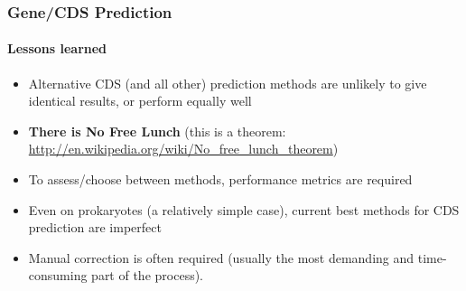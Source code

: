 \begin{frame}
   \frametitle{Gene/CDS Prediction}   
   \framesubtitle{Lessons learned}   
   \begin{itemize}
     \item Alternative CDS (and all other) prediction methods are unlikely to give identical results, or perform equally well
     \item \textbf{There is No Free Lunch} (this is a theorem: \href{http://en.wikipedia.org/wiki/No_free_lunch_theorem}{http://en.wikipedia.org/wiki/No\_free\_lunch\_theorem})
     \item To assess/choose between methods, performance metrics are required
     \item Even on prokaryotes (a relatively simple case), current best methods for CDS prediction are imperfect
     \item Manual correction is often required (usually the most demanding and time-consuming part of the process).
   \end{itemize}
\end{frame}
